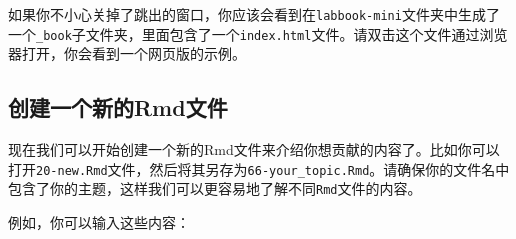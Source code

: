 \documentclass[]{ctexbook}
\theoremstyle{definition}
\theoremstyle{definition}
\theoremstyle{definition}
\theoremstyle{definition}
\theoremstyle{remark}
\begin{document}
如果你不小心关掉了跳出的窗口，你应该会看到在\texttt{labbook-mini}文件夹中生成了一个\texttt{\_book}子文件夹，里面包含了一个\texttt{index.html}文件。请双击这个文件通过浏览器打开，你会看到一个网页版的示例。

\subsection{创建一个新的Rmd文件}\label{ux521bux5efaux4e00ux4e2aux65b0ux7684rmdux6587ux4ef6}

现在我们可以开始创建一个新的Rmd文件来介绍你想贡献的内容了。比如你可以打开\texttt{20-new.Rmd}文件，然后将其另存为\texttt{66-your\_topic.Rmd}。请确保你的文件名中包含了你的主题，这样我们可以更容易地了解不同\texttt{Rmd}文件的内容。

例如，你可以输入这些内容：
\end{document}
